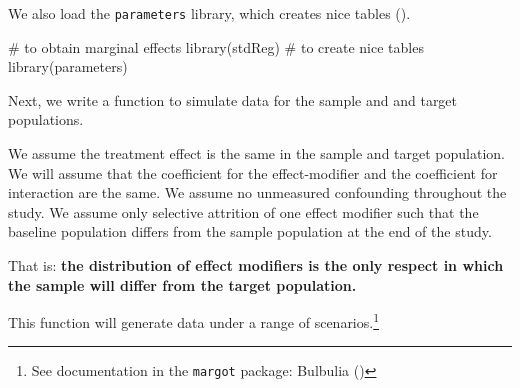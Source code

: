 \documentclass[
  singlecolumn]{article}
\newenvironment{Shaded}{\begin{snugshade}}{\end{snugshade}}
\newcommand{\CommentTok}[1]{\textcolor[rgb]{0.37,0.37,0.37}{#1}}
\newcommand{\FunctionTok}[1]{\textcolor[rgb]{0.28,0.35,0.67}{#1}}
\newcommand{\NormalTok}[1]{\textcolor[rgb]{0.00,0.23,0.31}{#1}}
\begin{document}
We also load the \texttt{parameters} library, which creates nice tables
().

\begin{Shaded}
\begin{Highlighting}[]
\CommentTok{\# to obtain marginal effects}
\FunctionTok{library}\NormalTok{(stdReg)}
\CommentTok{\# to create nice tables}
\FunctionTok{library}\NormalTok{(parameters)}
\end{Highlighting}
\end{Shaded}

Next, we write a function to simulate data for the sample and and target
populations.

We assume the treatment effect is the same in the sample and target
population. We will assume that the coefficient for the effect-modifier
and the coefficient for interaction are the same. We assume no
unmeasured confounding throughout the study. We assume only selective
attrition of one effect modifier such that the baseline population
differs from the sample population at the end of the study.

That is: \textbf{the distribution of effect modifiers is the only
respect in which the sample will differ from the target population.}

This function will generate data under a range of scenarios.\footnote{See
  documentation in the \texttt{margot} package: Bulbulia
  ()}
\end{document}
